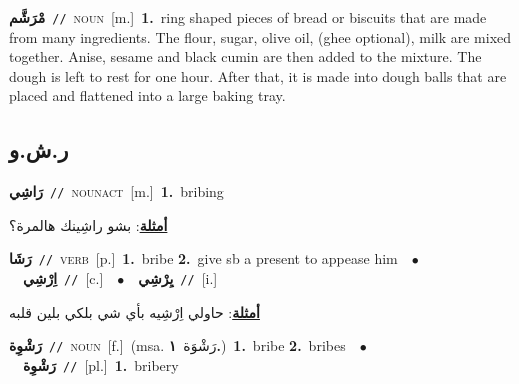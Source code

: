 \documentclass[10pt,a4paper,twoside]{article} %
\begin{document}
\begin{multicols}{2}
{\setlength\topsep{0pt}\textbf{\foreignlanguage{arabic}{مْرَشَّم}}\ {\color{gray}\texttt{//}\color{black}}\ \textsc{noun}\ [m.]\ \textbf{1.}~ring shaped pieces of bread or biscuits that are made from many ingredients. The flour, sugar, olive oil, (ghee optional), milk are mixed together. Anise, sesame and black cumin are then added to the mixture. The dough is left to rest for one hour. After that, it is made into dough balls that are placed and flattened into a large baking tray.\ } \vspace{2mm}

\vspace{-3mm}
\subsection*{\color{blue}\foreignlanguage{arabic}{ر.ش.و}\color{blue}{}} 

{\setlength\topsep{0pt}\textbf{\foreignlanguage{arabic}{رَاشِي}}\ {\color{gray}\texttt{//}\color{black}}\ \textsc{noun\textunderscore act}\ [m.]\ \textbf{1.}~bribing\  \begin{flushright}\color{gray}\foreignlanguage{arabic}{\textbf{\underline{\foreignlanguage{arabic}{أمثلة}}}: بشو راشِينك هالمرة؟}\end{flushright}\color{black}} \vspace{2mm}

{\setlength\topsep{0pt}\textbf{\foreignlanguage{arabic}{رَشَا}}\ {\color{gray}\texttt{//}\color{black}}\ \textsc{verb}\ [p.]\ \textbf{1.}~bribe  \textbf{2.}~give sb a present to appease him\ \ $\bullet$\ \ \setlength\topsep{0pt}\textbf{\foreignlanguage{arabic}{اِرْشِي}}\ {\color{gray}\texttt{//}\color{black}}\ [c.]\ \ $\bullet$\ \ \setlength\topsep{0pt}\textbf{\foreignlanguage{arabic}{يِرْشِي}}\ {\color{gray}\texttt{//}\color{black}}\ [i.]\  \begin{flushright}\color{gray}\foreignlanguage{arabic}{\textbf{\underline{\foreignlanguage{arabic}{أمثلة}}}: حاولي اِرْشِيه بأي شي بلكي بلين قلبه}\end{flushright}\color{black}} \vspace{2mm}

{\setlength\topsep{0pt}\textbf{\foreignlanguage{arabic}{رَشْوِة}}\ {\color{gray}\texttt{//}\color{black}}\ \textsc{noun}\ [f.]\ \color{gray}(msa. \foreignlanguage{arabic}{رَشْوَة}~\foreignlanguage{arabic}{\textbf{١.}})\color{black}\ \textbf{1.}~bribe  \textbf{2.}~bribes\ \ $\bullet$\ \ \setlength\topsep{0pt}\textbf{\foreignlanguage{arabic}{رَشْوِة}}\ {\color{gray}\texttt{//}\color{black}}\ [pl.]\ \textbf{1.}~bribery\ } \vspace{2mm}


\end{multicols}
\end{document}
